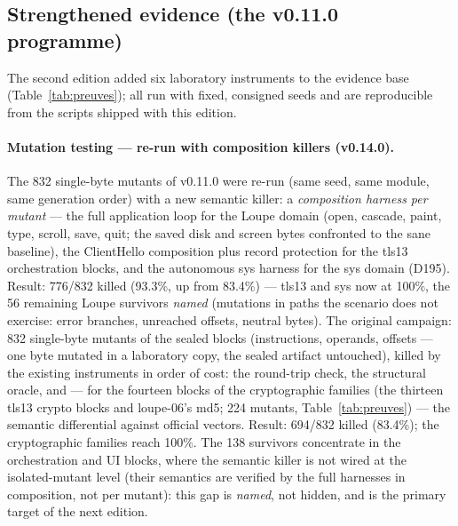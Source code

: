 \documentclass[11pt,a4paper]{article}
\begin{document}
\subsection{Strengthened evidence (the v0.11.0 programme)}\label{sec:renforce}

The second edition added six laboratory instruments to the evidence base
(Table~\ref{tab:preuves}); all run with fixed, consigned seeds and are
reproducible from the scripts shipped with this edition.

\paragraph{Mutation testing --- re-run with composition killers (v0.14.0).} The 832
single-byte mutants of v0.11.0 were re-run (same seed, same module,
same generation order) with a new semantic killer: a \emph{composition
harness per mutant} --- the full application loop for the Loupe domain
(open, cascade, paint, type, scroll, save, quit; the saved disk and
screen bytes confronted to the sane baseline), the ClientHello composition
plus record protection for the tls13 orchestration blocks, and the
autonomous sys harness for the sys domain (D195). Result: 776/832
killed (93.3\%, up from 83.4\%) --- tls13 and sys now at 100\%, the
56 remaining Loupe survivors \emph{named} (mutations in paths the
scenario does not exercise: error branches, unreached offsets,
neutral bytes). The original campaign: 832 single-byte mutants of the sealed blocks
(instructions, operands, offsets --- one byte mutated in a laboratory copy,
the sealed artifact untouched), killed by the existing instruments in
order of cost: the round-trip check, the structural oracle, and --- for the fourteen
blocks of the cryptographic families (the thirteen tls13 crypto blocks
and loupe-06's md5; 224 mutants, Table~\ref{tab:preuves}) --- the
semantic differential against official vectors. Result: 694/832 killed (83.4\%);
the cryptographic families reach 100\%. The 138 survivors concentrate in
the orchestration and UI blocks, where the semantic killer is not wired
at the isolated-mutant level (their semantics are verified by the full
harnesses in composition, not per mutant): this gap is \emph{named}, not
hidden, and is the primary target of the next edition.
\end{document}

